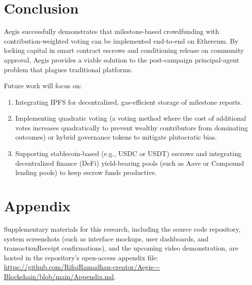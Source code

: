 \documentclass[conference]{IEEEtran}
\begin{document}
\section{Conclusion}
Aegis successfully demonstrates that milestone-based crowdfunding with contribution-weighted voting can be implemented end-to-end on Ethereum. By locking capital in smart contract escrows and conditioning release on community approval, Aegis provides a viable solution to the post-campaign principal-agent problem that plagues traditional platforms. 

Future work will focus on:
\begin{enumerate}
	\item Integrating IPFS for decentralized, gas-efficient storage of milestone reports.
	\item Implementing quadratic voting (a voting method where the cost of additional votes increases quadratically to prevent wealthy contributors from dominating outcomes) or hybrid governance tokens to mitigate plutocratic bias.
	\item Supporting stablecoin-based (e.g., USDC or USDT) escrows and integrating decentralized finance (DeFi) yield-bearing pools (such as Aave or Compound lending pools) to keep escrow funds productive.
\end{enumerate}

\section*{Appendix}
Supplementary materials for this research, including the source code repository, system screenshots (such as interface mockups, user dashboards, and transactionReceipt confirmations), and the upcoming video demonstration, are hosted in the repository's open-access appendix file: \url{https://github.com/RifqiRamadhan-creator/Aegis---Blockchain/blob/main/Appendix.md}.
\end{document}
